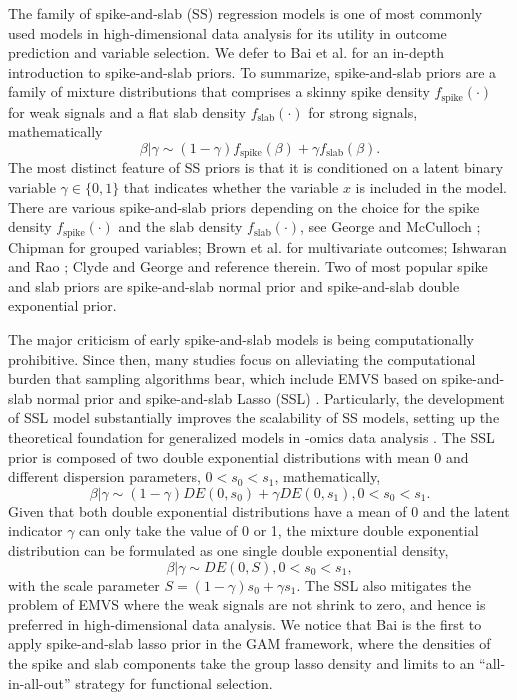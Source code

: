 \documentclass[AMA,STIX1COL,]{WileyNJD-v2}
\begin{document}
The family of spike-and-slab (SS) regression models is one of most
commonly used models in high-dimensional data analysis for its utility
in outcome prediction and variable selection. We defer to Bai et al.
\citep{Bai2021Review} for an in-depth introduction to spike-and-slab
priors. To summarize, spike-and-slab priors are a family of mixture
distributions that comprises a skinny spike density
\(f_{\text{spike}}(\cdot)\) for weak signals and a flat slab density
\(f_{\text{slab}}(\cdot)\) for strong signals, mathematically \[
 \beta|\gamma \sim (1-\gamma)f_{\text{spike}}(\beta) + \gamma f_{\text{slab}}(\beta).
\] The most distinct feature of SS priors is that it is conditioned on a
latent binary variable \(\gamma \in \{0,1\}\) that indicates whether the
variable \(x\) is included in the model. There are various
spike-and-slab priors depending on the choice for the spike density
\(f_{\text{spike}}(\cdot)\) and the slab density
\(f_{\text{slab}}(\cdot)\), see George and McCulloch
\citep{George1993, George1997}; Chipman \citep{Chipman1996} for grouped
variables; Brown et al. \citep{Brown1998} for multivariate outcomes;
Ishwaran and Rao \citep{Ishwaran2005}; Clyde and George
\citep{Clyde2004} and reference therein. Two of most popular spike and
slab priors are spike-and-slab normal prior \citep{George1993} and
spike-and-slab double exponential prior\citep{Rockova2018}.

The major criticism of early spike-and-slab models is being
computationally prohibitive. \citep{Bai2021Review} Since then, many
studies focus on alleviating the computational burden that sampling
algorithms bear, which include EMVS based on spike-and-slab normal
prior\citep{Rockova2014a} and spike-and-slab Lasso (SSL)
\citep{Rockova2018b, Rockova2018}. Particularly, the development of SSL
model substantially improves the scalability of SS models, setting up
the theoretical foundation for generalized models in -omics data
analysis \citep{Tang2017a, Tang2017, Tang2018, Tang2019}. The SSL prior
is composed of two double exponential distributions with mean 0 and
different dispersion parameters, \(0 < s_0 < s_1\), mathematically,
\begin{equation} 
\beta | \gamma \sim (1-\gamma)DE(0, s_0) + \gamma DE(0, s_1), 0 < s_0 < s_1.\nonumber
\end{equation} Given that both double exponential distributions have a
mean of 0 and the latent indicator \(\gamma\) can only take the value of
0 or 1, the mixture double exponential distribution can be formulated as
one single double exponential density, \begin{equation} \label{eq:ssl}
\beta | \gamma \sim DE(0, S), 0 < s_0 < s_1,
\end{equation} with the scale parameter
\(S = (1-\gamma)s_0 + \gamma s_1\). The SSL also mitigates the problem
of EMVS where the weak signals are not shrink to zero, and hence is
preferred in high-dimensional data analysis. We notice that Bai
\citep{Bai2021} is the first to apply spike-and-slab lasso prior in the
GAM framework, where the densities of the spike and slab components take
the group lasso density \citep{Xu2015} and limits to an
``all-in-all-out'' strategy for functional selection.
\end{document}
